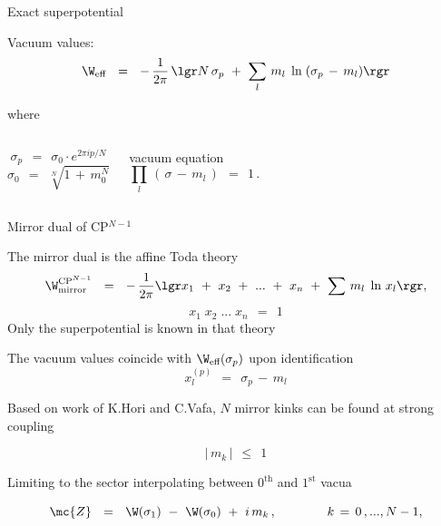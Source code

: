 \documentclass{beamer}
\begin{document}
\begin{frame}{Exact superpotential}

	Vacuum values:
\[
	\W_\text{eff} ~~=~~ -\, \frac{1}{2\pi}\, \lgr N \,\sigma_p  ~+~  \sum_l\, m_l\; \ln\; ( \sigma_p \,-\, m_l ) \rgr
\]

	where
\begin{columns}
\[
	\sigma_p ~~=~~ \sigma_0 \cdot e^{2 \pi i p / N}
\]
\[
	\sigma_0 ~~=~~ \sqrt[N]{ 1 \,+\, m_0^N }
\]

\vspace{2mm}
\begin{block}{vacuum equation}
\[
	\prod_l\, (\, \sigma \,-\, m_l \,) ~~=~~ 1\,.
\]
\end{block}

\end{columns}

\end{frame}


\begin{frame}{Mirror dual of CP$^{N-1}$}

	The mirror dual is the affine Toda theory
\[
	\W_\text{mirror}^\text{CP$^{N-1}$} ~~=~~
	-\, \frac{1}{2\pi}
	\lgr  
		x_1 ~+~ x_2 ~+~ ... ~+~ x_n ~+~
		\sum\, m_l\; \ln\, x_l 
	\rgr,
\]
\vspace{-4mm}
\[
	x_1\; x_2\; ...\; x_n ~~=~~ 1
\]
	Only the superpotential is known in that theory

\vspace{7mm}
	The vacuum values coincide with $ \W_\text{eff}(\sigma_p) $ upon
	identification
\[
	x_l^{(p)} ~~=~~ \sigma_p \,-\, m_l
\]

\end{frame}


\begin{frame}{}

	Based on work of K.Hori and C.Vafa, $ N $ mirror kinks
	can be found at strong coupling

\[
	| \,m_k\, | ~~\leq~~ 1
\]

	Limiting to the sector interpolating between $0^\text{th}$ and $ 1^\text{st} $ vacua

\[
	\mc{Z} ~~=~~ \W(\sigma_1) ~-~ \W(\sigma_0) ~+~ i\,m_k\,,
	\qquad\qquad k \,=\, 0\,, ..., N-1,
\]

\end{frame}
\end{document}

